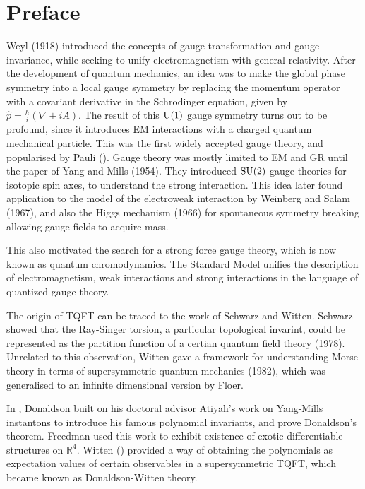 \chapter*{Preface}\label{preface}

Weyl (1918) introduced the concepts of gauge transformation and gauge
invariance, while seeking to unify electromagnetism with general relativity. After the
development of quantum mechanics, an idea was to make the global phase symmetry
into a local gauge symmetry by replacing the momentum operator with a covariant 
derivative in the Schrodinger equation, given by 
$\widehat{p}=\frac{\hbar}{i}(\nabla+iA)$. The result of this $\operatorname{U}(1)$ gauge symmetry
turns out to be profound, since it introduces EM interactions with a charged
quantum mechanical particle. This was the first widely accepted gauge theory,
and popularised by Pauli (\citeyear{pauli_em}).\cite{pauli_em}
Gauge theory was mostly limited to EM and GR until the paper of Yang and Mills 
(1954). They introduced $\operatorname{SU}(2)$ gauge theories for
isotopic spin axes, to understand the strong interaction. This idea later found
application to the model of the electroweak interaction by Weinberg and Salam
(1967), and also the Higgs mechanism (1966) for spontaneous symmetry breaking
allowing gauge fields to acquire mass. 

This also motivated the search for a strong force gauge theory, which is now
known as quantum chromodynamics. The Standard Model unifies the description of
electromagnetism, weak interactions and strong interactions in the language of
quantized gauge theory. 

The origin of TQFT can be traced to the work of Schwarz and Witten.
Schwarz showed that the Ray-Singer torsion, a particular topological invarint,
could be represented as the partition function of a certian quantum field theory
(1978). Unrelated to this observation, Witten gave a framework for understanding
Morse theory in terms of supersymmetric quantum mechanics (1982), which was 
generalised to an infinite dimensional version by Floer. 

In \citeyear{don83}, Donaldson built on his doctoral advisor Atiyah's work on 
Yang-Mills instantons to introduce his famous polynomial invariants, and prove 
Donaldson's theorem.\cite{don83}
Freedman used this work to exhibit existence of exotic differentiable
structures on $\mathbb{R}^{4}$. 
Witten (\citeyear{wittenTQFT}) provided a way
of obtaining the polynomials as expectation values of certain observables in 
a supersymmetric TQFT, which became
known as Donaldson-Witten theory.\cite{wittenTQFT}

